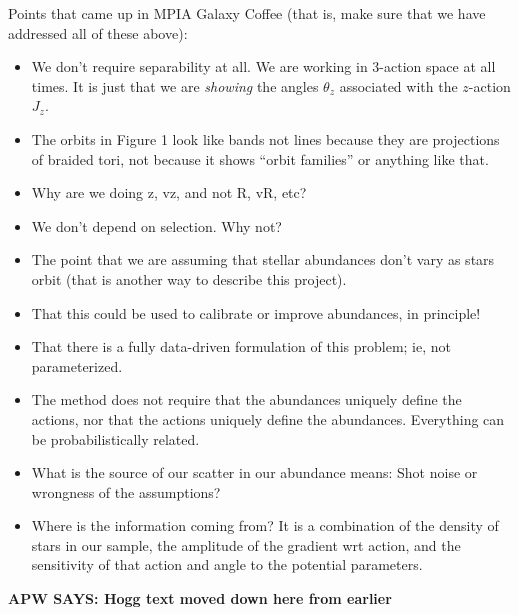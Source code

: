 \documentclass[modern]{aastex63}
\begin{document}
Points that came up in MPIA Galaxy Coffee (that is, make sure that we
have addressed all of these above):
\begin{itemize}
\item
  We don't require separability at all. We are working in 3-action
  space at all times. It is just that we are \emph{showing} the angles
  $\theta_z$ associated with the $z$-action $J_z$.
\item
  The orbits in Figure 1 look like bands not lines because they are
  projections of braided tori, not because it shows ``orbit families''
  or anything like that.
\item
  Why are we doing z, vz, and not R, vR, etc?
\item
  We don't depend on selection. Why not?
\item
  The point that we are assuming that stellar abundances don't vary as
  stars orbit (that is another way to describe this project).
\item
  That this could be used to calibrate or improve abundances, in
  principle!
\item
  That there is a fully data-driven formulation of this problem; ie, not
  parameterized.
\item
  The method does not require that the abundances uniquely define the
  actions, nor that the actions uniquely define the
  abundances. Everything can be probabilistically related.
\item
  What is the source of our scatter in our abundance means: Shot noise
  or wrongness of the assumptions?
\item
  Where is the information coming from? It is a combination of the
  density of stars in our sample, the amplitude of the gradient wrt
  action, and the sensitivity of that action and angle to the potential
  parameters.
\end{itemize}

\textbf{APW SAYS: Hogg text moved down here from earlier}
\end{document}
